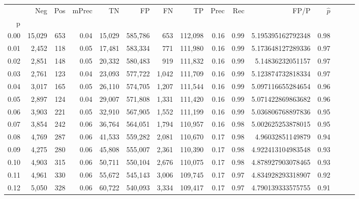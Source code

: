\begin{tabular}{rrrrrrrrrrrrrrr}
\toprule
{} &     Neg &    Pos & mPrec &       TN &       FP &       FN &       TP &  Prec &   Rec &                  FP/P & $\hat{p}$ \\
p    &         &        &       &          &          &          &          &       &       &                       &           \\
\midrule
0.00 &  15,029 &    653 &  0.04 &   15,029 &  585,786 &      653 &  112,098 &  0.16 &  0.99 &     5.195395162792348 &      0.98 \\
0.01 &   2,452 &    118 &  0.05 &   17,481 &  583,334 &      771 &  111,980 &  0.16 &  0.99 &     5.173648127289336 &      0.97 \\
0.02 &   2,851 &    148 &  0.05 &   20,332 &  580,483 &      919 &  111,832 &  0.16 &  0.99 &      5.14836232051157 &      0.97 \\
0.03 &   2,761 &    123 &  0.04 &   23,093 &  577,722 &    1,042 &  111,709 &  0.16 &  0.99 &     5.123874732818334 &      0.97 \\
0.04 &   3,017 &    165 &  0.05 &   26,110 &  574,705 &    1,207 &  111,544 &  0.16 &  0.99 &     5.097116655284654 &      0.96 \\
0.05 &   2,897 &    124 &  0.04 &   29,007 &  571,808 &    1,331 &  111,420 &  0.16 &  0.99 &     5.071422869863682 &      0.96 \\
0.06 &   3,903 &    221 &  0.05 &   32,910 &  567,905 &    1,552 &  111,199 &  0.16 &  0.99 &     5.036806768897836 &      0.95 \\
0.07 &   3,854 &    242 &  0.06 &   36,764 &  564,051 &    1,794 &  110,957 &  0.16 &  0.98 &     5.002625253878015 &      0.95 \\
0.08 &   4,769 &    287 &  0.06 &   41,533 &  559,282 &    2,081 &  110,670 &  0.17 &  0.98 &      4.96032851149879 &      0.94 \\
0.09 &   4,275 &    280 &  0.06 &   45,808 &  555,007 &    2,361 &  110,390 &  0.17 &  0.98 &     4.922413104983548 &      0.93 \\
0.10 &   4,903 &    315 &  0.06 &   50,711 &  550,104 &    2,676 &  110,075 &  0.17 &  0.98 &     4.878927903078465 &      0.93 \\
0.11 &   4,961 &    330 &  0.06 &   55,672 &  545,143 &    3,006 &  109,745 &  0.17 &  0.97 &     4.834928293318907 &      0.92 \\
0.12 &   5,050 &    328 &  0.06 &   60,722 &  540,093 &    3,334 &  109,417 &  0.17 &  0.97 &     4.790139333575755 &      0.91 \\

\end{tabular}
